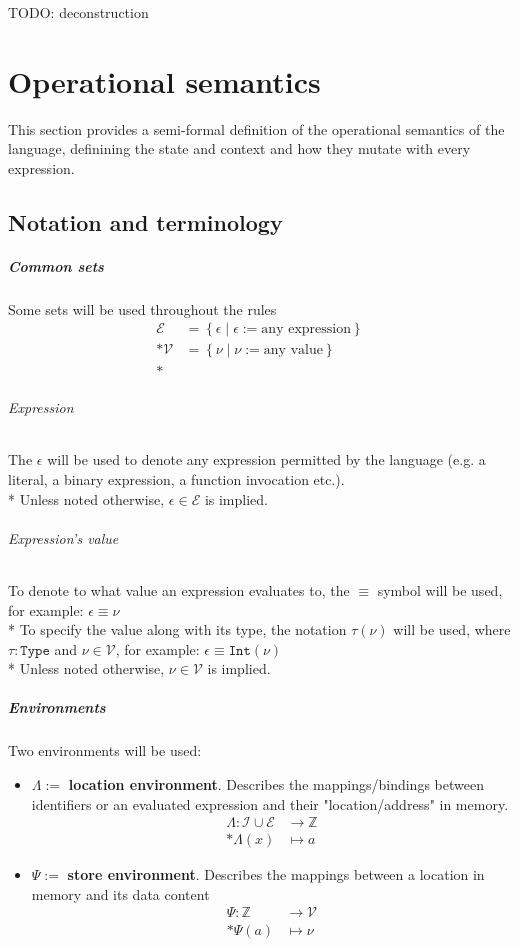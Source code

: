 \documentclass[11pt]{report}
\newcommand{\set}[1]{\left\{#1\right\}}
\newcommand{\expr}{\epsilon}
\newcommand{\val}{\nu}
\newcommand{\Id}{\mathcal{I}}
\newcommand{\Expr}{\mathcal{E}}
\newcommand{\Val}{\mathcal{V}}
\newcommand{\Type}{\texttt{Type}}
\newcommand{\Int}{\texttt{Int}}
\newcommand{\EnvLoc}{\Lambda}
\newcommand{\EnvStore}{\Psi}
\theoremstyle{definition}
\newcommand{\comment}[1]{
	\parbox{0.9\linewidth}{\color{black!30}\small\sffamily #1}
}
\begin{document}
\comment{TODO: deconstruction}

\chapter{Operational semantics}

This section provides a semi-formal definition of the operational semantics of
the language, definining the state and context and how they mutate with every
expression.

\section{Notation and terminology}

\paragraph{Common sets} Some sets will be used throughout the rules
\[
	\begin{split}
		\Expr &= \set{\expr \mid \expr := \text{any expression}} \\*
		\Val  &= \set{\val \mid \val := \text{any value}} \\*
	\end{split}
\]

\subparagraph{Expression} The $\expr$ will be used to denote any expression
permitted by the language (e.g. a literal, a binary expression, a function
invocation etc.).\\*
Unless noted otherwise, $\expr \in \Expr$ is implied.

\subparagraph{Expression's value} To denote to what value an expression evaluates
to, the $\equiv$ symbol will be used, for example: $\expr \equiv \val$\\*
To specify the value along with its type, the notation $\tau(\val)$ will be
used, where $\tau:\Type$ and $\val\in\Val$, for example:
$\expr\equiv\Int(\val)$\\*
Unless noted otherwise, $\val \in \Val$ is implied.

\paragraph{Environments} Two environments will be used:
\begin{itemize}
	\item $\EnvLoc :=$ \textbf{location environment}. Describes the
		mappings/bindings between identifiers or an evaluated expression and
		their "location/address" in memory.
		\[
			\begin{split}
				\EnvLoc: \Id \cup \Expr & \to \mathbb{Z}\\*
				\EnvLoc(x) & \mapsto a
			\end{split}
		\]
	\item $\EnvStore :=$ \textbf{store environment}. Describes the mappings
		between a location in memory and its data content
		\[
			\begin{split}
				\EnvStore : \mathbb{Z} & \to \Val \\*
				\EnvStore(a) & \mapsto \val
			\end{split}
		\]
\end{itemize}
\end{document}
